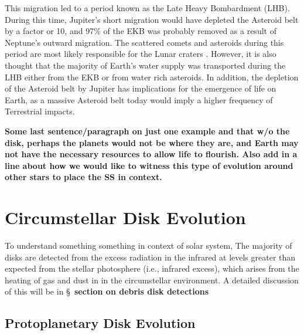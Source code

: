     This migration led to a period known as the Late Heavy Bombardment (LHB). During this time, Jupiter's short migration would have depleted the Asteroid belt by a factor or 10, and 97\% of the EKB was probably removed as a result of Neptune's outward migration. The scattered comets and asteroids during this period are most likely responsible for the Lunar craters \citep{Gomes2005}. However, it is also thought that the majority of Earth's water supply was transported during the LHB either from the EKB or from water rich asteroids. In addition, the depletion of the Asteroid belt by Jupiter has implications for the emergence of life on Earth, as a massive Asteroid belt today would imply a higher frequency of Terrestrial impacts. 
    
    \textbf{Some last sentence/paragraph on just one example and that w/o the disk, perhaps the planets would not be where they are, and Earth may not have the necessary resources to allow life to flourish. Also add in a line about how we would like to witness this type of evolution around other stars to place the SS in context.}
    
    




\section{Circumstellar Disk Evolution}
    
    To understand something something in context of solar system, 
    The majority of disks are detected from the excess radiation in the infrared at levels greater than expected from the stellar photosphere (i.e., infrared excess), which arises from the heating of gas and dust in in the circumstellar environment. A detailed discussion of this will be in \S~\textbf{section on debris disk detections}


    \subsection{Protoplanetary Disk Evolution}
    
